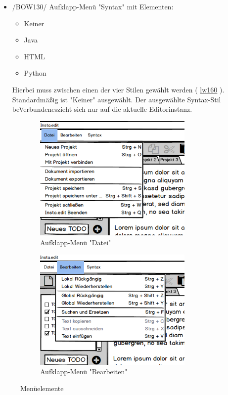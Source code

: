 \documentclass{scrartcl}
\newcommand{\refFunction}[1]{%
  \hyperlink{#1}{\csname #1\endcsname}%
  }
\begin{document}
\begin{itemize}
\item /BOW130/ Aufklapp-Menü "Syntax"  mit Elementen:
\begin{itemize}
\item Keiner
\item Java
\item HTML
\item Python
\end{itemize}
Hierbei muss zwischen einen der vier Stilen gewählt werden (\refFunction{lw160}). Standardmäßig ist "Keiner" ausgewählt. Der ausgewählte Syntax-Stil beVerbundeneszieht sich nur auf die aktuelle Editorinstanz.
\end{itemize}

\begin{figure}[h]
	\centering
	\begin{subfigure}{.49\textwidth}
	\centering
  \includegraphics[width=0.85\textwidth]{img/screen_datei}
	\caption{Aufklapp-Menü "Datei"}
	\label{fig:datei}
\end{subfigure}
\begin{subfigure}{.49\textwidth}
	\centering
  \includegraphics[width=0.85\textwidth]{img/screen_bearbeiten}\caption{Aufklapp-Menü "Bearbeiten"}
	\label{fig:bearbeiten}
	\end{subfigure}
	\caption{Menüelemente}
\end{figure}
\end{document}
